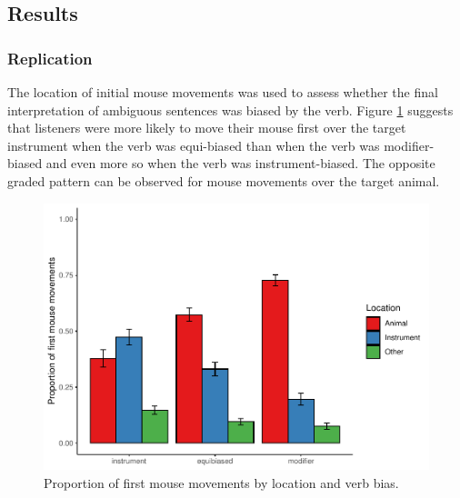 \documentclass[
  man,floatsintext]{apa6}
\begin{document}
\hypertarget{results-3}{%
\subsection{Results}\label{results-3}}

\hypertarget{replication-2}{%
\subsubsection{Replication}\label{replication-2}}

The location of initial mouse movements was used to assess whether the final interpretation of ambiguous sentences was biased by the verb. Figure \ref{fig:E4-mouse-moves-fig} suggests that listeners were more likely to move their mouse first over the target instrument when the verb was equi-biased than when the verb was modifier-biased and even more so when the verb was instrument-biased. The opposite graded pattern can be observed for mouse movements over the target animal.

\begin{figure}
\centering
\includegraphics{manuscript_files/figure-latex/E4-mouse-moves-fig-1.pdf}
\caption{\label{fig:E4-mouse-moves-fig}Proportion of first mouse movements by location and verb bias.}
\end{figure}
\end{document}
